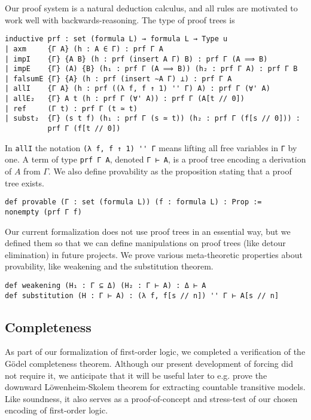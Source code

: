 \documentclass[a4paper,USenglish,cleveref, autoref]{lipics-v2019}
\newcommand{\lil}{\lstinline}
\theoremstyle{theorem}
\theoremstyle{definition}
\begin{document}
Our proof system is a natural deduction calculus, and %
all rules are motivated to work well with backwards-reasoning. The type of proof trees is
\begin{lstlisting}
inductive prf : set (formula L) → formula L → Type u
| axm     {Γ A} (h : A ∈ Γ) : prf Γ A
| impI    {Γ} {A B} (h : prf (insert A Γ) B) : prf Γ (A ⟹ B)
| impE    {Γ} (A) {B} (h₁ : prf Γ (A ⟹ B)) (h₂ : prf Γ A) : prf Γ B
| falsumE {Γ} {A} (h : prf (insert ∼A Γ) ⊥) : prf Γ A
| allI    {Γ A} (h : prf ((λ f, f ↑ 1) '' Γ) A) : prf Γ (∀' A)
| allE₂   {Γ} A t (h : prf Γ (∀' A)) : prf Γ (A[t // 0])
| ref     (Γ t) : prf Γ (t ≃ t)
| subst₂  {Γ} (s t f) (h₁ : prf Γ (s ≃ t)) (h₂ : prf Γ (f[s // 0])) :
          prf Γ (f[t // 0])
\end{lstlisting}
In \lil{allI} the notation \lil{(λ f, f ↑ 1) '' Γ} means lifting all free variables in \lil{Γ} by one.
A term of type \lil{prf Γ A}, denoted \lil{Γ ⊢ A}, is a proof tree encoding a derivation of $A$ from $\Gamma$.
We also define provability as the proposition stating that a proof tree exists.
\begin{lstlisting}
def provable (Γ : set (formula L)) (f : formula L) : Prop :=
nonempty (prf Γ f)
\end{lstlisting}
Our current formalization does not use proof trees in an essential way, but we defined them so that we can define manipulations on proof trees (like detour elimination) in future projects.
We prove various meta-theoretic properties about provability, like weakening and the substitution theorem.
\begin{lstlisting}
def weakening (H₁ : Γ ⊆ Δ) (H₂ : Γ ⊢ A) : Δ ⊢ A
def substitution (H : Γ ⊢ A) : (λ f, f[s // n]) '' Γ ⊢ A[s // n]
\end{lstlisting}

\subsection{Completeness}
As part of our formalization of first-order logic, we completed a verification of the G\"odel completeness theorem. Although our present development of forcing did not require it, we anticipate that it will be useful later to e.g. prove the downward L\"owenheim-Skolem theorem for extracting countable transitive models. Like soundness, it also serves as a proof-of-concept and stress-test of our chosen encoding of first-order logic.
\end{document}
